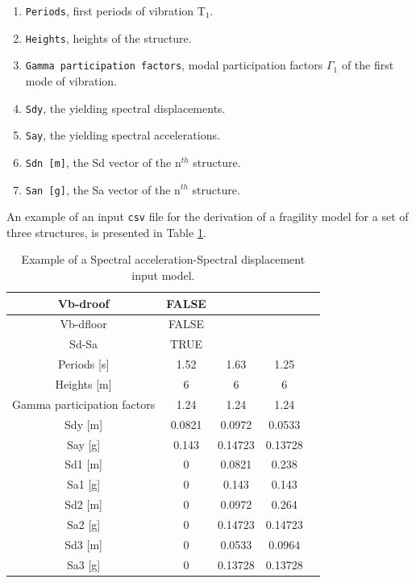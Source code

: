 \begin{enumerate}
\item \verb=Periods=, first periods of vibration T$_1$.
\item \verb=Heights=, heights of the structure.
\item \verb=Gamma participation factors=, modal participation factors $\Gamma_1$ of the first mode of vibration.
\item \verb=Sdy=, the yielding spectral displacements.
\item \verb=Say=, the yielding spectral accelerations.
\item \verb=Sdn [m]=, the Sd vector of the n$^{th}$ structure.
\item \verb=San [g]=, the Sa vector of the n$^{th}$ structure. \\
\end{enumerate}

An example of an input \verb=csv= file for the derivation of a fragility model for a set of three structures, is presented in Table \ref{table:Sa-Sd_input}.

\begin {table}[htb]
\caption{Example of a Spectral acceleration-Spectral displacement input model.}
\label{table:Sa-Sd_input}
\begin{center}
  \begin{tabular}{ | c | c | c | c | c |}
  \hline
	Vb-droof &	FALSE & &  \\ \hline
	Vb-dfloor & 	FALSE & & \\ \hline
	Sd-Sa &	TRUE & & \\ \hline
	Periods [s] &	1.52 &	1.63 &	1.25 \\ \hline
	Heights [m]	& 6 &	6	& 6 \\ \hline
	Gamma participation factors	& 1.24 &	1.24 &	1.24 \\ \hline
	Sdy [m] & 	0.0821 & 	0.0972 &	0.0533\\ \hline
	Say [g]	& 0.143	& 0.14723	& 0.13728 \\ \hline
	Sd1 [m]	& 0 &	0.0821	& 0.238 \\ \hline
	Sa1 [g]	& 0	& 0.143	& 0.143 \\ \hline
	Sd2 [m] &	0 & 0.0972	& 0.264 \\ \hline
	Sa2 [g]	& 0	& 0.14723	& 0.14723 \\ \hline
	Sd3 [m]	& 0	& 0.0533	& 0.0964 \\ \hline
	Sa3 [g]	& 0	& 0.13728	& 0.13728 \\ \hline
  \end{tabular}
\end{center}
\end{table}